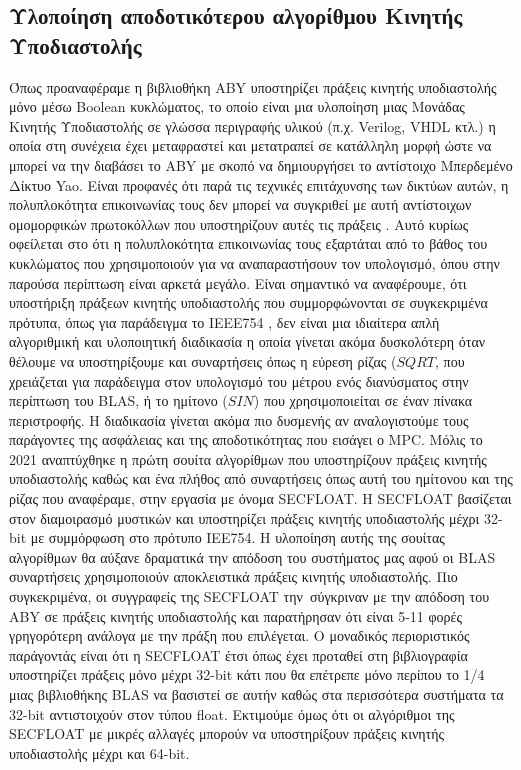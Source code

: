 \subsection{Υλοποίηση αποδοτικότερου αλγορίθμου Κινητής Υποδιαστολής}
Όπως προαναφέραμε η βιβλιοθήκη ABY υποστηρίζει πράξεις κινητής υποδιαστολής μόνο μέσω Boolean κυκλώματος, το οποίο είναι μια υλοποίηση μιας Μονάδας Κινητής Υποδιαστολής σε γλώσσα περιγραφής υλικού (π.χ. Verilog, VHDL κτλ.) η οποία στη συνέχεια έχει μεταφραστεί και μετατραπεί σε κατάλληλη μορφή ώστε να μπορεί να την διαβάσει το ABY με σκοπό να δημιουργήσει το αντίστοιχο Μπερδεμένο Δίκτυο Yao. Είναι προφανές ότι παρά τις τεχνικές επιτάχυνσης των δικτύων αυτών, η πολυπλοκότητα επικοινωνίας τους δεν μπορεί να συγκριθεί με αυτή αντίστοιχων ομομορφικών πρωτοκόλλων που υποστηρίζουν αυτές τις πράξεις \cite{cryptoeprint:2022/322} \cite{alxd1}. Αυτό κυρίως οφείλεται στο ότι η πολυπλοκότητα επικοινωνίας τους εξαρτάται από το βάθος του κυκλώματος που χρησιμοποιούν για να αναπαραστήσουν τον υπολογισμό, όπου στην παρούσα περίπτωση είναι αρκετά μεγάλο. Είναι σημαντικό να αναφέρουμε, ότι υποστήριξη πράξεων κινητής υποδιαστολής που συμμορφώνονται σε συγκεκριμένα πρότυπα, όπως για παράδειγμα το IEEE754 \cite{8766229}, δεν είναι μια ιδιαίτερα απλή αλγοριθμική και υλοποιητική διαδικασία \cite{10.5555/1096483} η οποία γίνεται ακόμα δυσκολότερη όταν θέλουμε να υποστηρίξουμε και συναρτήσεις όπως η εύρεση ρίζας ($SQRT$, που χρειάζεται για παράδειγμα στον υπολογισμό του μέτρου ενός διανύσματος στην περίπτωση του BLAS, ή το ημίτονο ($SIN$) που χρησιμοποιείται σε έναν πίνακα περιστροφής. Η διαδικασία γίνεται ακόμα πιο δυσμενής αν αναλογιστούμε τους παράγοντες της ασφάλειας και της αποδοτικότητας που εισάγει ο MPC. Μόλις το 2021 αναπτύχθηκε η πρώτη σουίτα αλγορίθμων που υποστηρίζουν πράξεις κινητής υποδιαστολής καθώς και ένα πλήθος από συναρτήσεις όπως αυτή του ημίτονου και της ρίζας που αναφέραμε, στην εργασία \cite{cryptoeprint:2022/322} με όνομα SECFLOAT. Η SECFLOAT βασίζεται στον διαμοιρασμό μυστικών και υποστηρίζει πράξεις κινητής υποδιαστολής μέχρι 32-bit με συμμόρφωση στο πρότυπο IEE754. Η υλοποίηση αυτής της σουίτας αλγορίθμων θα αύξανε δραματικά την απόδοση του συστήματος μας αφού οι BLAS συναρτήσεις χρησιμοποιούν αποκλειστικά πράξεις κινητής υποδιαστολής. Πιο συγκεκριμένα, οι συγγραφείς της SECFLOAT την\ σύγκριναν με την απόδοση του ABY σε πράξεις κινητής υποδιαστολής και παρατήρησαν ότι είναι 5-11 φορές γρηγορότερη ανάλογα με την πράξη που επιλέγεται. Ο μοναδικός περιοριστικός παράγοντάς είναι ότι η SECFLOAT έτσι όπως έχει προταθεί στη βιβλιογραφία υποστηρίζει πράξεις μόνο μέχρι 32-bit κάτι που θα επέτρεπε μόνο περίπου το 1/4 μιας βιβλιοθήκης BLAS να βασιστεί σε αυτήν καθώς στα περισσότερα συστήματα τα 32-bit αντιστοιχούν στον τύπου float. Εκτιμούμε όμως ότι οι αλγόριθμοι της SECFLOAT με μικρές αλλαγές μπορούν να υποστηρίξουν πράξεις κινητής υποδιαστολής μέχρι και 64-bit.

